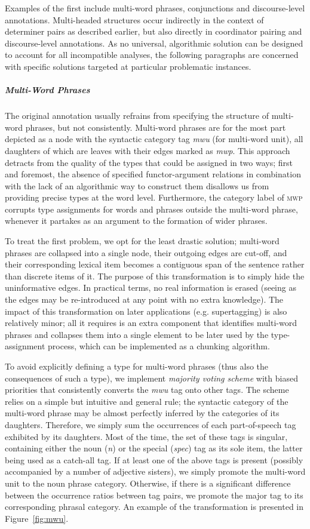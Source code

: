 Examples of the first include multi-word phrases, conjunctions and discourse-level annotations.
Multi-headed structures occur indirectly in the context of determiner pairs as described earlier, but also directly in coordinator pairing and discourse-level annotations.
As no universal, algorithmic solution can be designed to account for all incompatible analyses, the following paragraphs are concerned with specific solutions targeted at particular problematic instances.

\subparagraph{Multi-Word Phrases}
The original annotation usually refrains from specifying the structure of multi-word phrases, but not consistently.
Multi-word phrases are for the most part depicted as a node with the syntactic category tag \textit{mwu} (for multi-word unit), all daughters of which are leaves with their edges marked as \textit{mwp}.
This approach detracts from the quality of the types that could be assigned in two ways; first and foremost, the absence of specified functor-argument relations in combination with the lack of an algorithmic way to construct them disallows us from providing precise types at the word level.
Furthermore, the category label of \textsc{mwp} corrupts type assignments for words and phrases outside the multi-word phrase, whenever it partakes as an argument to the formation of wider phrases.

To treat the first problem, we opt for the least drastic solution; multi-word phrases are collapsed into a single node, their outgoing edges are cut-off, and their corresponding lexical item becomes a contiguous span of the sentence rather than discrete items of it. 
The purpose of this transformation is to simply hide the uninformative edges.
In practical terms, no real information is erased (seeing as the edges may be re-introduced at any point with no extra knowledge).
The impact of this transformation on later applications (e.g. supertagging) is also relatively minor; all it requires is an extra component that identifies multi-word phrases and collapses them into a single element to be later used by the type-assignment process, which can be implemented as a chunking algorithm.

To avoid explicitly defining a type for multi-word phrases (thus also the consequences of such a type), we implement \textit{majority voting scheme} with biased priorities that consistently converts the \textit{mwu} tag onto other tags.
The scheme relies on a simple but intuitive and general rule; the syntactic category of the multi-word phrase may be almost perfectly inferred by the categories of its daughters. 
Therefore, we simply sum the occurrences of each part-of-speech tag exhibited by its daughters. 
Most of the time, the set of these tags is singular, containing either the noun (\textit{n}) or the special (\textit{spec}) tag as its sole item, the latter being used as a catch-all tag.
If at least one of the above tags is present (possibly accompanied by a number of adjective sisters), we simply promote the multi-word unit to the noun phrase category.
Otherwise, if there is a significant difference between the occurrence ratios between tag pairs, we promote the major tag to its corresponding phrasal category. 
An example of the transformation is presented in Figure~\ref{fig:mwu}.

